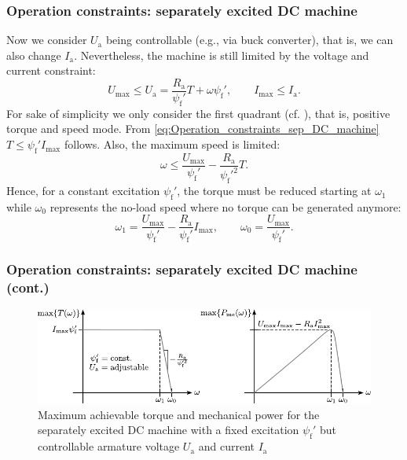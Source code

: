 \begin{frame}
	\frametitle{Operation constraints: separately excited DC machine}
			Now we consider $U_\mathrm{a}$ being controllable (e.g., via buck converter), that is, we can also change $I_\mathrm{a}$. Nevertheless, the machine is still limited by the voltage and current constraint:
			\begin{equation}
				U_\mathrm{max} \leq U_\mathrm{a} = \frac{R_\mathrm{a}}{\psi_\mathrm{f}'} T + \omega \psi_\mathrm{f}', \qquad I_\mathrm{max} \leq I_\mathrm{a}.
				\label{eq:Operation_constraints_sep_DC_machine}
			\end{equation} \pause
			For sake of simplicity we only consider the first quadrant (cf. ), that is, positive torque and speed mode. \pause From \eqref{eq:Operation_constraints_sep_DC_machine} $T\leq \psi_\mathrm{f}' I_\mathrm{max}$ follows. \pause Also, the maximum speed is limited:
			\begin{equation}
				\omega \leq \frac{U_\mathrm{max}}{\psi_\mathrm{f}'} - \frac{R_\mathrm{a}}{\psi_\mathrm{f}'^2} T.
			\end{equation} \pause
			Hence, for a constant excitation $\psi_\mathrm{f}'$, the torque must be reduced starting at $\omega_1$ while $\omega_0$ represents the no-load speed where no torque can be generated anymore:
			\begin{equation}
				\omega_1 = \frac{U_\mathrm{max}}{\psi_\mathrm{f}'} - \frac{R_\mathrm{a}}{\psi_\mathrm{f}'} I_\mathrm{max}, \qquad \omega_0 = \frac{U_\mathrm{max}}{\psi_\mathrm{f}'}.
			\end{equation}
\end{frame}

\begin{frame}
	\frametitle{Operation constraints: separately excited DC machine (cont.)}
	\begin{figure}
		\centering
		\includegraphics[scale=1.1]{fig/lec03/Sep_DC_machine_voltage_current_const.pdf}
		\caption{Maximum achievable torque and mechanical power for the separately excited DC machine with a fixed excitation $\psi_\mathrm{f}'$ but controllable armature voltage $U_\mathrm{a}$ and current $I_\mathrm{a}$}
		\label{fig:Sep_DC_machine_voltage_current_const}
\end{figure}
\end{frame}

